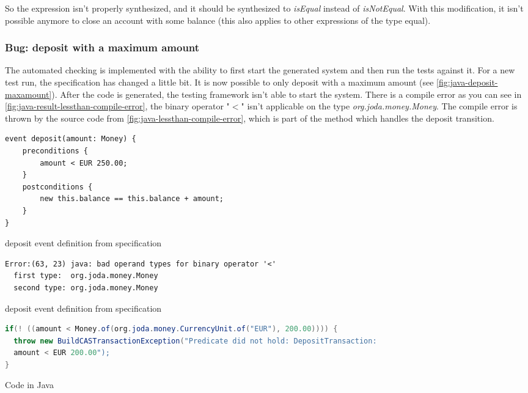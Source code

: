 So the expression isn't properly synthesized, and it should be synthesized to
\textit{isEqual} instead of \textit{isNotEqual}. With this modification, it
isn't possible anymore to close an account with some balance (this also applies
to other expressions of the type equal).

\subsubsection{Bug: deposit with a maximum amount}
\label{sec:bug-compile-max-deposit}

The automated checking is implemented with the ability to first start the
generated system and then run the tests against it. For a new test run, the
specification has changed a little bit. It is now possible to only deposit with
a maximum amount (see \autoref{fig:java-deposit-maxamount}). After the code is
generated, the testing framework isn't able to start the system. There is a
compile error as you can see in
\autoref{fig:java-result-lessthan-compile-error}, the binary operator "$<$"
isn't applicable on the type \textit{org.joda.money.Money}. The compile error
is thrown by the source code from \autoref{fig:java-lessthan-compile-error},
which is part of the method which handles the deposit transition.


\begin{sourcecode}[h!]
\begin{lstlisting}[]
event deposit(amount: Money) {
	preconditions {
		amount < EUR 250.00;
	}
	postconditions {
		new this.balance == this.balance + amount;
	}
}
\end{lstlisting}
\caption{deposit event definition from specification}
\label{fig:java-deposit-maxamount}
\end{sourcecode}

\begin{sourcecode}[h!]
\begin{lstlisting}[]
Error:(63, 23) java: bad operand types for binary operator '<'
  first type:  org.joda.money.Money
  second type: org.joda.money.Money
\end{lstlisting}
\caption{deposit event definition from specification}
\label{fig:java-result-lessthan-compile-error}
\end{sourcecode}

\begin{sourcecode}[h!]
\begin{lstlisting}[language=Java]
if(! ((amount < Money.of(org.joda.money.CurrencyUnit.of("EUR"), 200.00)))) {
  throw new BuildCASTransactionException("Predicate did not hold: DepositTransaction:
  amount < EUR 200.00");
}
\end{lstlisting}
\caption{Code in Java}
\label{fig:java-lessthan-compile-error}
\end{sourcecode}

